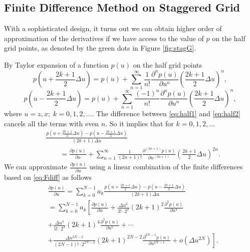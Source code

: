 \documentclass[11pt,titlepage]{article}
\theoremstyle{plain}
\theoremstyle{definition}
\theoremstyle{remark}
\numberwithin{equation}{section}
\begin{document}
\subsection{Finite Difference Method on Staggered Grid}
With a sophisticated design, it turns out we can obtain higher order of approximation of the derivatives if we have access to the value of $p$ on the half grid points, as denoted by the green dots in Figure \ref{fig:stagG}. 

By Taylor expansion of a function $p(u)$ on the half grid points
  \begin{equation}\label{eq:half1}
      p\left(u + \frac{2k+1}{2}\Delta u\right) = p(u) + \sum\limits_{n=1}^{\infty} \frac{1}{n!}     \frac{\partial^n p(u)}{\partial u^n}\left(\frac{2k+1}{2}\Delta u\right)^n, 
      \end{equation}
      \begin{equation}\label{eq:half2}
      p\left(u - \frac{2k+1}{2}\Delta u\right) = p(u) + \sum\limits_{n=1}^{\infty} \frac{(-1)^n}{n!}\frac{\partial^n p(u)}{\partial u^n}\left(\frac{2k+1}{2}\Delta u\right)^n,
  \end{equation}
where $u = z, x; \; k = 0, 1, 2, \dots $.
The difference between \eqref{eq:half1} and \eqref{eq:half2} cancels all the terms with even $n$.
So it implies that for $k = 0, 1, 2, \dots$
\begin{equation}
\label{eq:Fdiff}
    \begin{aligned}
   &  \frac{p\left(u + \frac{2k+1}{2}\Delta u\right) - p\left(u - \frac{2k+1}{2}\Delta u\right)}{(2k+1)\Delta u}\\
    &~~~~~~~~~  =  \frac{\partial p(u)}{\partial u} + \sum\limits_{n=1 }^{\infty} \frac{1}{(2n+1)!}\frac{\partial^{(2n+1)} p(u)}{\partial u^{(2n+1)}}\left(\frac{2k+1}{2}\Delta u\right)^{2n}.
    \end{aligned}
    \end{equation}
We can approximate $\frac{\partial p(u)}{\partial u}$ using a linear combination of the finite differences based on \eqref{eq:Fdiff} as follows
  \begin{equation}
  \label{eq:weight}
  \begin{aligned}
    &\frac{\partial p(u)}{\partial u} = \sum\limits_{k=0}^{N-1} a_k \frac{p\left(u + \frac{2k+1}{2}\Delta u\right) - p\left(u - \frac{2k+1}{2}\Delta u\right)}{(2k+1)\Delta u} \\
    &= \sum\limits_{k=0}^{N-1} a_k \left[ \frac{\partial p(u)}{\partial u} + \frac{\Delta u^2}{3! \cdot 2^2}(2k+1)^2\frac{\partial^3 p(u)}{\partial u^3} \right.\\&\left. + \frac{\Delta u^4}{5! \cdot 2^4}(2k+1)^4\frac{\partial^5 p(u)}{\partial u^5} + \cdots \right.\\&\left. + \frac{\Delta u^{2N-2}}{(2N-1)! \cdot 2^{2N-2}}(2k+1)^{2N-2}\frac{\partial^{2N-1} p(u)}{\partial u^{2N-1}} + o(\Delta u^{2N}) \right].
  \end{aligned}
  \end{equation}
\end{document}
